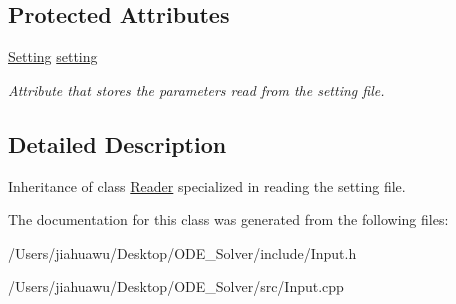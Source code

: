 \subsection*{Protected Attributes}
\begin{DoxyCompactItemize}
\item 
\mbox{\label{class_setting___reader_a5684da80f00261842f462606a1bfd5c8}} 
\mbox{\hyperlink{struct_setting}{Setting}} \mbox{\hyperlink{class_setting___reader_a5684da80f00261842f462606a1bfd5c8}{setting}}
\begin{DoxyCompactList}\small\item\em Attribute that stores the parameters read from the setting file. \end{DoxyCompactList}\end{DoxyCompactItemize}


\subsection{Detailed Description}
Inheritance of class \mbox{\hyperlink{class_reader}{Reader}} specialized in reading the setting file. 

The documentation for this class was generated from the following files\+:\begin{DoxyCompactItemize}
\item 
/\+Users/jiahuawu/\+Desktop/\+O\+D\+E\+\_\+\+Solver/include/Input.\+h\item 
/\+Users/jiahuawu/\+Desktop/\+O\+D\+E\+\_\+\+Solver/src/Input.\+cpp\end{DoxyCompactItemize}
